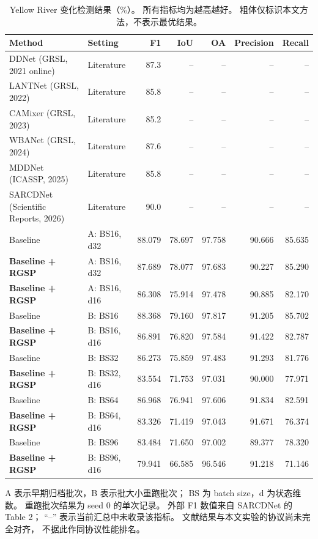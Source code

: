 \documentclass[journal]{IEEEtran}
\begin{document}
\begin{table}[tp]
\centering
\footnotesize
\setlength{\tabcolsep}{2pt}
\renewcommand{\arraystretch}{1.12}
\caption{Yellow River 变化检测结果（\%）。
所有指标均为越高越好。
粗体仅标识本文方法，不表示最优结果。}
\label{tab:yellow_river_comparison}
\begin{tabularx}{\linewidth}{@{}Xlrrrrr@{}}
\toprule
Method & Setting & F1 & IoU & OA & Precision & Recall \\
\midrule
DDNet (GRSL, 2021 online)
& Literature & 87.3 & -- & -- & -- & -- \\
LANTNet (GRSL, 2022)
& Literature & 85.8 & -- & -- & -- & -- \\
CAMixer (GRSL, 2023)
& Literature & 85.2 & -- & -- & -- & -- \\
WBANet (GRSL, 2024)
& Literature & 87.6 & -- & -- & -- & -- \\
MDDNet (ICASSP, 2025)
& Literature & 85.8 & -- & -- & -- & -- \\
SARCDNet (Scientific Reports, 2026)
& Literature & 90.0 & -- & -- & -- & -- \\
\midrule
Baseline
& A: BS16, d32
& 88.079 & 78.697 & 97.758 & 90.666 & 85.635 \\
\textbf{Baseline + RGSP}
& A: BS16, d32
& 87.689 & 78.077 & 97.683 & 90.227 & 85.290 \\
\textbf{Baseline + RGSP}
& A: BS16, d16
& 86.308 & 75.914 & 97.478 & 90.885 & 82.170 \\
\midrule
Baseline
& B: BS16
& 88.368 & 79.160 & 97.817 & 91.205 & 85.702 \\
\textbf{Baseline + RGSP}
& B: BS16, d16
& 86.891 & 76.820 & 97.584 & 91.422 & 82.787 \\
Baseline
& B: BS32
& 86.273 & 75.859 & 97.483 & 91.293 & 81.776 \\
\textbf{Baseline + RGSP}
& B: BS32, d16
& 83.554 & 71.753 & 97.031 & 90.000 & 77.971 \\
Baseline
& B: BS64
& 86.968 & 76.941 & 97.606 & 91.834 & 82.591 \\
\textbf{Baseline + RGSP}
& B: BS64, d16
& 83.326 & 71.419 & 97.043 & 91.671 & 76.374 \\
Baseline
& B: BS96
& 83.484 & 71.650 & 97.002 & 89.377 & 78.320 \\
\textbf{Baseline + RGSP}
& B: BS96, d16
& 79.941 & 66.585 & 96.546 & 91.218 & 71.146 \\
\bottomrule
\end{tabularx}

\smallskip
\begin{minipage}{\linewidth}
\footnotesize
A 表示早期归档批次，B 表示批大小重跑批次；
BS 为 batch size，d 为状态维数。
重跑批次结果为 seed 0 的单次记录。
外部 F1 数值来自 SARCDNet 的 Table 2；
``--'' 表示当前汇总中未收录该指标。
文献结果与本文实验的协议尚未完全对齐，
不据此作同协议性能排名。
\end{minipage}
\end{table}


\end{document}
